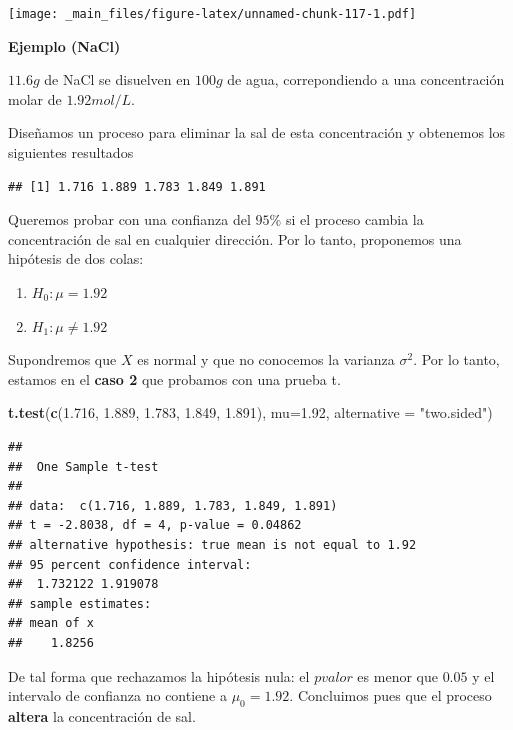 \documentclass[
]{book}
\newenvironment{Shaded}{\begin{snugshade}}{\end{snugshade}}
\newcommand{\AttributeTok}[1]{\textcolor[rgb]{0.13,0.29,0.53}{#1}}
\newcommand{\FloatTok}[1]{\textcolor[rgb]{0.00,0.00,0.81}{#1}}
\newcommand{\FunctionTok}[1]{\textcolor[rgb]{0.13,0.29,0.53}{\textbf{#1}}}
\newcommand{\NormalTok}[1]{#1}
\newcommand{\StringTok}[1]{\textcolor[rgb]{0.31,0.60,0.02}{#1}}
\providecommand{\tightlist}{%
  \setlength{\itemsep}{0pt}\setlength{\parskip}{0pt}}
\begin{document}
\texttt{[image: \_main\_files/figure-latex/unnamed-chunk-117-1.pdf]}

\textbf{Ejemplo (NaCl)}

\(11.6 g\) de NaCl se disuelven en \(100 g\) de agua, correpondiendo a una concentración molar de \(1.92 mol/L\).

Diseñamos un proceso para eliminar la sal de esta concentración y obtenemos los siguientes resultados

\begin{verbatim}
## [1] 1.716 1.889 1.783 1.849 1.891
\end{verbatim}

Queremos probar con una confianza del \(95\%\) si el proceso cambia la concentración de sal en cualquier dirección. Por lo tanto, proponemos una hipótesis de dos colas:

\begin{enumerate}
\def\labelenumi{\alph{enumi}.}
\tightlist
\item
  \(H_0:\mu=1.92\)
\item
  \(H_1:\mu\neq 1.92\)
\end{enumerate}

Supondremos que \(X\) es normal y que no conocemos la varianza \(\sigma^2\). Por lo tanto, estamos en el \textbf{caso 2} que probamos con una prueba t.

\begin{Shaded}
\begin{Highlighting}[]
\FunctionTok{t.test}\NormalTok{(}\FunctionTok{c}\NormalTok{(}\FloatTok{1.716}\NormalTok{, }\FloatTok{1.889}\NormalTok{, }\FloatTok{1.783}\NormalTok{, }\FloatTok{1.849}\NormalTok{, }\FloatTok{1.891}\NormalTok{), }
       \AttributeTok{mu=}\FloatTok{1.92}\NormalTok{, }\AttributeTok{alternative =} \StringTok{"two.sided"}\NormalTok{)}
\end{Highlighting}
\end{Shaded}

\begin{verbatim}
## 
##  One Sample t-test
## 
## data:  c(1.716, 1.889, 1.783, 1.849, 1.891)
## t = -2.8038, df = 4, p-value = 0.04862
## alternative hypothesis: true mean is not equal to 1.92
## 95 percent confidence interval:
##  1.732122 1.919078
## sample estimates:
## mean of x 
##    1.8256
\end{verbatim}

De tal forma que rechazamos la hipótesis nula: el \(pvalor\) es menor que \(0.05\) y el intervalo de confianza no contiene a \(\mu_0=1.92\). Concluimos pues que el proceso \textbf{altera} la concentración de sal.
\end{document}

